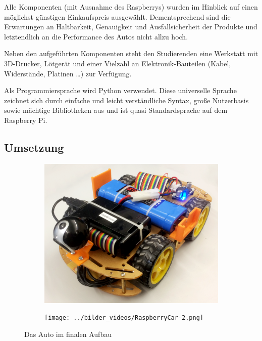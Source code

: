 \documentclass[a4paper, 12pt]{scrartcl}
\begin{document}
Alle Komponenten (mit Ausnahme des Raspberrys) wurden im Hinblick auf einen möglichst günstigen Einkaufspreis ausgewählt. Dementsprechend sind die Erwartungen an Haltbarkeit, Genauigkeit und Ausfallsicherheit der Produkte und letztendlich an die Performance des Autos nicht allzu hoch.

Neben den aufgeführten Komponenten steht den Studierenden eine Werkstatt mit 3D-Drucker, Lötgerät und einer Vielzahl an Elektronik-Bauteilen (Kabel, Widerstände, Platinen \ldots) zur Verfügung.

Als Programmiersprache wird Python verwendet. Diese universelle Sprache zeichnet sich durch einfache und leicht verständliche Syntax, große Nutzerbasis sowie mächtige Bibliotheken aus und ist quasi Standardsprache auf dem Raspberry Pi.

\subsection{Umsetzung}

\begin{figure}[H] 
	\centering
	\begin{subfigure}{.5\textwidth} 
		\centering
		\includegraphics[width=\textwidth]{../bilder_videos/RaspberryCar.png}
	\end{subfigure}%
	\begin{subfigure}{.5\textwidth} 
		\centering
		\texttt{[image: ../bilder\_videos/RaspberryCar-2.png]}
	\end{subfigure}%
	\caption{Das Auto im finalen Aufbau}
	\label{auto}
\end{figure}
\end{document}
